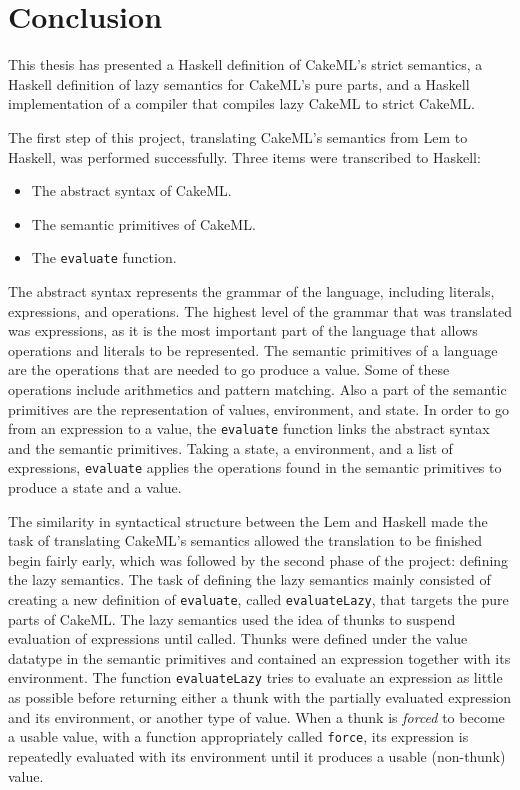 \chapter{Conclusion}
This thesis has presented a Haskell definition of CakeML's strict semantics,
a Haskell definition of lazy semantics for CakeML's pure parts, and a Haskell
implementation of a compiler that compiles lazy CakeML to strict CakeML.

The first step of this project, translating CakeML's semantics from Lem to
Haskell, was performed successfully. Three items were transcribed to Haskell:

\begin{itemize}
\item The abstract syntax of CakeML.
\item The semantic primitives of CakeML.
\item The \texttt{evaluate} function.
\end{itemize}
The abstract syntax represents the grammar of the language, including literals,
expressions, and operations. The highest level of the grammar that was
translated was expressions, as it is the most important part of the language
that allows operations and literals to be represented.
The semantic primitives of a language are the operations that are needed
to go produce a value. Some of these operations include arithmetics and
pattern matching. Also a part of the semantic primitives are the representation
of values, environment, and state.
In order to go from an expression to a value, the \texttt{evaluate} function
links the abstract syntax and the semantic primitives. Taking a state,
a environment, and a list of expressions, \texttt{evaluate} applies the
operations found in the semantic primitives to produce a state and a value.

The similarity in syntactical structure between the Lem and Haskell made the
task of translating CakeML's semantics allowed the translation to be finished
begin fairly early, which was followed by the second phase of the project:
defining the lazy semantics. The task of defining the lazy semantics mainly
consisted of creating a new definition of \texttt{evaluate}, called
\texttt{evaluateLazy}, that targets the pure parts of CakeML.
The lazy semantics used the idea of thunks to suspend
evaluation of expressions until called. Thunks were defined under the value
datatype in the semantic primitives and contained an expression together with
its environment. The function \texttt{evaluateLazy} tries to evaluate an
expression as little as possible before returning either a thunk with the
partially evaluated expression and its environment, or another type of value.
When a thunk is \textit{forced} to become a usable value, with a function
appropriately called \texttt{force}, its expression is repeatedly evaluated with
its environment until it produces a usable (non-thunk) value.

